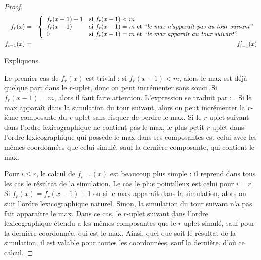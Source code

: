 \begin{proof}
			\begin{eqnarray}
				f_{r}(x) & = & \casedist{
									f_{r}(x-1) + 1 & \text{si $f_{r}(x-1) < m$} \\
									f_{r}(x-1) & \text{si $f_{r}(x-1) = m$ et \textquoted{\emph{le max n'apparaît pas au tour suivant}}}\\
									0 & \text{si $f_{r}(x-1) = m$ et \textquoted{\emph{le max apparaît au tour suivant}}}
									}\\
				f_{i-1}(x) & = & f'_{i-1}(x)
			\end{eqnarray}
			
			Expliquons. 
			
			Le premier cas de $f_{r}(x)$ est trivial : si $f_{r}(x-1)<m$, alors le max est déjà quelque part dans le $r$-uplet, donc on peut incrémenter sans souci. Si $f_{r}(x-1) = m$, alors il faut faire attention. L'expression  se traduit par : . Si le max apparaît dans la simulation du tour suivant, alors on peut incrémenter la $r$-ième composante du $r$-uplet sans risquer de perdre le max. Si le $r$-uplet suivant dans l'ordre lexicographique ne contient pas le max, le plus petit $r$-uplet dans l'ordre lexicographique qui possède le max dans ses composantes est celui avec les mêmes coordonnées que celui simulé, sauf la dernière composante, qui contient le max.
			
			Pour $i\leqslant r$, le calcul de $f_{i-1}(x)$ est beaucoup plus simple : il reprend dans tous les cas le résultat de la simulation. Le cas le plus pointilleux est celui pour $i=r$. Si $f_{r}(x) = f_{r}(x-1) + 1$ ou si le max apparaît dans la simulation, alors on suit l'ordre lexicographique naturel. Sinon, la simulation du tour suivant n'a pas fait apparaître le max. Dans ce cas, le $r$-uplet suivant dans l'ordre lexicographique étendu a les mêmes composantes que le $r$-uplet simulé, sauf pour la dernière coordonnée, qui est le max. Ainsi, quel que soit le résultat de la simulation, il est valable pour toutes les coordonnées, sauf la dernière, d'où ce calcul.
			

\end{proof}

